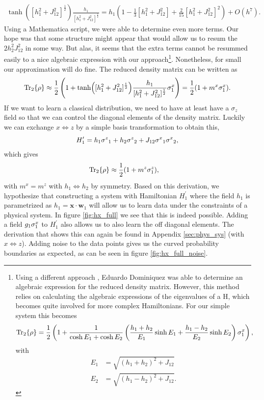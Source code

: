 \begin{align*}
    \tanh([h_1^2 + J_{12}^2]^\frac{1}{2})\frac{h_1}{[h_1^2 + J_{12}^2]^\frac{1}{2}}= h_1\left(1  - \frac{1}{3} \left[h_1^2 + J_{12}^2 \right]  + \frac{2}{15}\left[h_1^2 + J_{12}^2\right]^2\right) + O(h^7).
\end{align*}
Using a Mathematica script, we were able to determine even more terms. Our hope was that some structure might appear that would allow us to resum the $2h_2^2 J_{12}^2$ in some way. But alas, it seems that the extra terms cannot be resummed easily to a nice algebraic expression with our approach\footnote{Using a different approach \cite{DeZela2014}, Eduardo Dominiquez was able to determine an algebraic expression for the reduced density matrix. However, this method relies on calculating the algebraic expressions of the eigenvalues of a H, which becomes quite involved for more complex Hamiltonians. For our simple system this becomes 
\begin{align*}
    \Tr_2\{\rho\} &= \frac{1}{2}\left(1 + \frac{1}{\cosh{E_1} + \cosh{E_2}}\left(\frac{h_1 + h_2}{E_1}\sinh{E_1} + \frac{h_1 - h_2}{E_2}\sinh{E_2} \right)\sigma^{x}_1\right),
\end{align*}
with
\begin{align*}
    E_1 &= \sqrt{(h_1+h_2)^2+J_{12}}\\
    E_2 &= \sqrt{(h_1-h_2)^2+J_{12}}.
\end{align*}}.
\noindent Nonetheless, for small our approximation will do fine. The reduced density matrix can be written as 
\begin{equation}
    \Tr_2\{\rho\} \approx \frac{1}{2}\left(1 + \tanh([h_1^2 + J_{12}^2]^\frac{1}{2})\frac{h_1}{[h_1^2 + J_{12}^2]^\frac{1}{2}} \sigma^{x}_1 \right) = \frac{1}{2}(1 + m^x \sigma^{x}_1) \label{eq:tanh_tr}.
\end{equation}
If we want to learn a classical distribution, we need to have at least have a $\sigma_z$ field so that we can control the diagonal elements of the density matrix. Luckily we can exchange $x\Leftrightarrow z$ by a simple basis transformation to obtain this,
\begin{equation*}
    H_1^\prime = h_{1} {\sigma^{z}}_1 + h_2 {\sigma^{z}}_2 + J_{12} {\sigma^{x}}_1 {\sigma^{x}}_2,
\end{equation*}
which gives
\begin{align*}
     \Tr_2\{\rho\}  &\approx  \frac{1}{2}(1 + m^z\sigma^{z}_1),
\end{align*}
with $m^x=m^z$ with $h_1\Leftrightarrow h_2$ by symmetry. Based on this derivation, we hypothesize that constructing a system with Hamiltonian $H_1^\prime$ where the field $h_1$ is parametrized as $h_1=\mathbf{x}\cdot \mathbf{w}_1$ will allow us to learn data under the constraints of a physical system. In figure \ref{fig:hx_full} we see that this is indeed possible. Adding a field $g_1 \sigma^{x}_1$ to $H_1^\prime$ also allows us to also learn the off diagonal elements. The derivation that shows this can again be found in Appendix \ref{sec:phys_sys} (with $x\Leftrightarrow z$). Adding noise to the data points gives us the curved probability boundaries as expected, as can be seen in figure \ref{fig:hx_full_noise}. \newline

